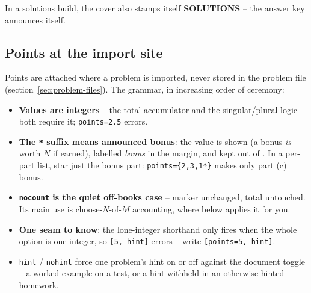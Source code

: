 In a solutions build, the cover also stamps itself
{\sffamily\bfseries\color{SolutionColor}SOLUTIONS} -- the answer key
announces itself.

\subsection{Points at the import site}

Points are attached where a problem is imported, never stored in the problem
file (section~\ref{sec:problem-files}). The grammar, in increasing order of
ceremony:

\begin{manexsource}
\end{manexsource}

\begin{itemize}
  \item \textbf{Values are integers} -- the total accumulator and the
    singular/plural logic both require it; \texttt{points=2.5} errors.
  \item \textbf{The \texttt{*} suffix means announced bonus}: the value is
    shown (a bonus \emph{is} worth $N$ if earned), labelled \emph{bonus} in
    the margin, and kept out of . In a per-part list,
    star just the bonus part: \texttt{points=\{2,3,1*\}} makes only part (c)
    bonus.
  \item \textbf{\texttt{nocount} is the quiet off-books case} -- marker
    unchanged, total untouched. Its main use is choose-$N$-of-$M$ accounting,
    where  below applies it for you.
  \item \textbf{One seam to know}: the lone-integer shorthand only fires when
    the whole option is one integer, so \texttt{[5, hint]} errors -- write
    \texttt{[points=5, hint]}.
  \item \texttt{hint} / \texttt{nohint} force one problem's hint on or off
    against the document toggle -- a worked example on a test, or a hint
    withheld in an otherwise-hinted homework.
\end{itemize}

